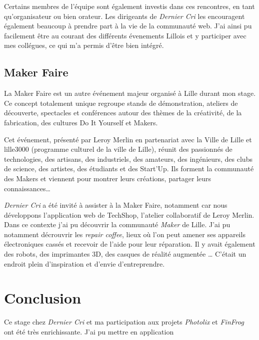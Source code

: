 \bigskip

Certains membres de l'équipe sont également investis dans ces
rencontres, en tant qu'organisateur ou bien orateur. Les dirigeants de
\emph{Dernier Cri} les encouragent également beaucoup à prendre part à
la vie de la communauté web. J'ai ainsi pu facilement être au courant
des différents évenements Lillois et y participer avec mes collégues, ce
qui m'a permis d'être bien intégré.

\bigskip

\subsection{Maker Faire}\label{maker-faire}

\bigskip

La Maker Faire est un autre événement majeur organisé à Lille durant mon
stage. Ce concept totalement unique regroupe stands de démonstration,
ateliers de découverte, spectacles et conférences autour des thèmes de
la créativité, de la fabrication, des cultures Do It Yourself et Makers.

\bigskip

Cet événement, présenté par Leroy Merlin en partenariat avec la Ville de
Lille et lille3000 (programme culturel de la ville de Lille), réunit des
passionnés de technologies, des artisans, des industriels, des amateurs,
des ingénieurs, des clubs de science, des artistes, des étudiants et des
Start'Up. Ils forment la communauté des Makers et viennent pour montrer
leurs créations, partager leurs connaissances\ldots{}

\bigskip

\emph{Dernier Cri} a été invité à assister à la Maker Faire, notamment
car nous développons l'application web de TechShop, l'atelier
collaboratif de Leroy Merlin. Dans ce contexte j'ai pu découvrir la
communauté \emph{Maker} de Lille. J'ai pu notamment décrouvrir les
\emph{repair coffee}, lieux où l'on peut amener ses appareils
électroniques cassés et recevoir de l'aide pour leur réparation. Il y
avait également des robots, des imprimantes 3D, des casques de réalité
augmentée \ldots{} C'était un endroit plein d'inspiration et d'envie
d'entreprendre.

\newpage

\section{Conclusion}\label{conclusion-2}

Ce stage chez \emph{Dernier Cri} et ma participation aux projets
\emph{Photolix} et \emph{FinFrog} ont été très enrichissante. J'ai pu
mettre en application

